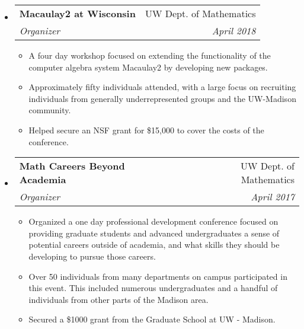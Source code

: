 \documentclass[letterpaper,11pt]{article}
\makeatletter
\newcommand{\ressubheading}[4]{
\begin{tabular*}{6.5in}[t]{l@{\cftdotfill{\cftsecdotsep}\extracolsep{\fill}}r}
		\textbf{#1} & #2 \\
		\textit{#3} & \textit{#4} \\
\end{tabular*}\vspace{-6pt}}
\makeatother
\begin{document}
\begin{itemize}
\item 
	\ressubheading{Macaulay2 at Wisconsin}{UW Dept. of Mathematics}{Organizer}{April 2018}
	\begin{itemize}
		\item A four day workshop focused on extending the functionality of the computer algebra system Macaulay2 by developing new packages.
		\item Approximately fifty individuals attended, with a large focus on recruiting individuals from generally underrepresented groups and the UW-Madison community.
		\item Helped secure an NSF grant for \$15,000 to cover the costs of the conference. 
	\end{itemize}
	
\item 
	\ressubheading{Math Careers Beyond Academia}{UW Dept. of Mathematics}{Organizer}{April 2017}
	\begin{itemize}
		\item Organized a one day professional development conference focused on providing graduate students and advanced undergraduates a sense of potential careers outside of academia, and what skills they should be developing to pursue those careers.
		\item Over 50 individuals from many departments on campus participated in this event. This included numerous undergraduates and a handful of individuals from other parts of the Madison area.
		\item Secured a \$1000 grant from the Graduate School at UW - Madison.
	\end{itemize}
	
\end{itemize}
\end{document}
